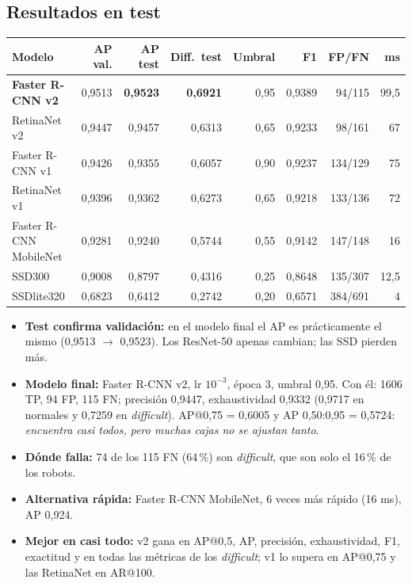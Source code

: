 \documentclass[11pt,a4paper]{article}
\begin{document}
\subsection{Resultados en test}
\begin{center}
\small
\begin{tabular}{@{}lrrrrrrr@{}}
\toprule
\textbf{Modelo} & \textbf{AP val.} & \textbf{AP test} & \textbf{Diff.\ test} & \textbf{Umbral} & \textbf{F1} & \textbf{FP/FN} & \textbf{ms} \\
\midrule
\textbf{Faster R-CNN v2} & 0,9513 & \textbf{0,9523} & \textbf{0,6921} & 0,95 & 0,9389 & 94/115 & 99,5 \\
RetinaNet v2 & 0,9447 & 0,9457 & 0,6313 & 0,65 & 0,9233 & 98/161 & 67 \\
Faster R-CNN v1 & 0,9426 & 0,9355 & 0,6057 & 0,90 & 0,9237 & 134/129 & 75 \\
RetinaNet v1 & 0,9396 & 0,9362 & 0,6273 & 0,65 & 0,9218 & 133/136 & 72 \\
Faster R-CNN MobileNet & 0,9281 & 0,9240 & 0,5744 & 0,55 & 0,9142 & 147/148 & 16 \\
SSD300 & 0,9008 & 0,8797 & 0,4316 & 0,25 & 0,8648 & 135/307 & 12,5 \\
SSDlite320 & 0,6823 & 0,6412 & 0,2742 & 0,20 & 0,6571 & 384/691 & 4 \\
\bottomrule
\end{tabular}
\end{center}

\begin{itemize}
  \item \textbf{Test confirma validación:} en el modelo final el AP es prácticamente el mismo (0,9513 $\rightarrow$ 0,9523). Los ResNet-50 apenas cambian; las SSD pierden más.
  \item \textbf{Modelo final:} Faster R-CNN v2, lr $10^{-3}$, época 3, umbral 0,95. Con él: 1606 TP, 94 FP, 115 FN; precisión 0,9447, exhaustividad 0,9332 (0,9717 en normales y 0,7259 en \emph{difficult}). AP@0,75 = 0,6005 y AP 0,50:0,95 = 0,5724: \emph{encuentra casi todos, pero muchas cajas no se ajustan tanto}.
  \item \textbf{Dónde falla:} 74 de los 115 FN (64\,\%) son \emph{difficult}, que son solo el 16\,\% de los robots.
  \item \textbf{Alternativa rápida:} Faster R-CNN MobileNet, 6 veces más rápido (16 ms), AP 0,924.
  \item \textbf{Mejor en casi todo:} v2 gana en AP@0,5, AP, precisión, exhaustividad, F1, exactitud y en todas las métricas de los \emph{difficult}; v1 lo supera en AP@0,75 y las RetinaNet en AR@100.
\end{itemize}
\end{document}
